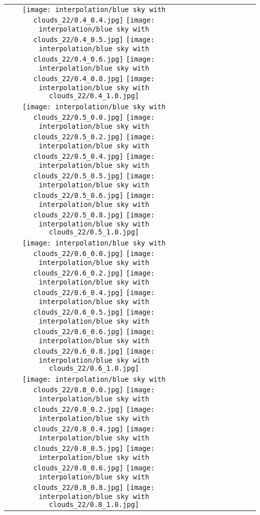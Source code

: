 \documentclass[10pt,twocolumn,letterpaper]{article}
\begin{document}
\begin{figure*}[tb!]
{\begin{tabular}{c c c c c c c c c c}
  \texttt{[image: interpolation/blue sky with clouds\_22/0.4\_0.4.jpg]}
  \texttt{[image: interpolation/blue sky with clouds\_22/0.4\_0.5.jpg]}
  \texttt{[image: interpolation/blue sky with clouds\_22/0.4\_0.6.jpg]}
  \texttt{[image: interpolation/blue sky with clouds\_22/0.4\_0.8.jpg]}
  \texttt{[image: interpolation/blue sky with clouds\_22/0.4\_1.0.jpg]}
\tabularnewline
    \raisebox{0.1in}{\rotatebox{90}{\small \emph{}
 }}
  \texttt{[image: interpolation/blue sky with clouds\_22/0.5\_0.0.jpg]}
  \texttt{[image: interpolation/blue sky with clouds\_22/0.5\_0.2.jpg]}
  \texttt{[image: interpolation/blue sky with clouds\_22/0.5\_0.4.jpg]}
  \texttt{[image: interpolation/blue sky with clouds\_22/0.5\_0.5.jpg]}
  \texttt{[image: interpolation/blue sky with clouds\_22/0.5\_0.6.jpg]}
  \texttt{[image: interpolation/blue sky with clouds\_22/0.5\_0.8.jpg]}
  \texttt{[image: interpolation/blue sky with clouds\_22/0.5\_1.0.jpg]}
\tabularnewline
    \raisebox{0.1in}{\rotatebox{90}{\small \emph{}
 }}
  \texttt{[image: interpolation/blue sky with clouds\_22/0.6\_0.0.jpg]}
  \texttt{[image: interpolation/blue sky with clouds\_22/0.6\_0.2.jpg]}
  \texttt{[image: interpolation/blue sky with clouds\_22/0.6\_0.4.jpg]}
  \texttt{[image: interpolation/blue sky with clouds\_22/0.6\_0.5.jpg]}
  \texttt{[image: interpolation/blue sky with clouds\_22/0.6\_0.6.jpg]}
  \texttt{[image: interpolation/blue sky with clouds\_22/0.6\_0.8.jpg]}
  \texttt{[image: interpolation/blue sky with clouds\_22/0.6\_1.0.jpg]}
\tabularnewline
    \raisebox{0.1in}{\rotatebox{90}{\small \emph{}
 }}
  \texttt{[image: interpolation/blue sky with clouds\_22/0.8\_0.0.jpg]}
  \texttt{[image: interpolation/blue sky with clouds\_22/0.8\_0.2.jpg]}
   \texttt{[image: interpolation/blue sky with clouds\_22/0.8\_0.4.jpg]}
  \texttt{[image: interpolation/blue sky with clouds\_22/0.8\_0.5.jpg]}
  \texttt{[image: interpolation/blue sky with clouds\_22/0.8\_0.6.jpg]}
  \texttt{[image: interpolation/blue sky with clouds\_22/0.8\_0.8.jpg]}
  \texttt{[image: interpolation/blue sky with clouds\_22/0.8\_1.0.jpg]}

\end{tabular}}
\end{figure*}
\end{document}
